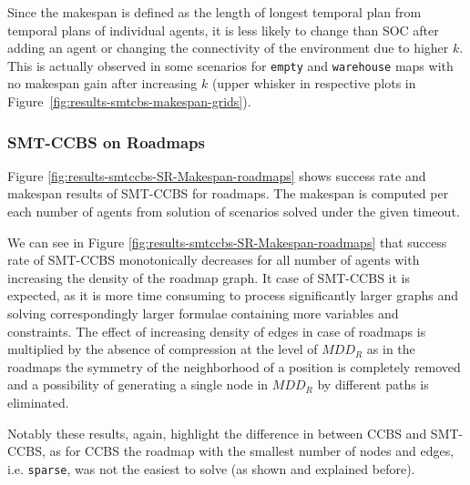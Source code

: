\documentclass[review]{elsarticle}
\newcommand{\mddr}{\ensuremath{MDD_R}\xspace}
\newcommand\roni[1]{\nb{\textbf{Roni:}}{green}{#1}}
\newcommand\pavel[1]{\nb{\textbf{Pavel:}}{blue}{#1}}
\newcommand{\ccbs}{\ac{CCBS}\xspace}
\newcommand{\smtccbs}{SMT-CCBS\xspace}
\begin{document}
Since the makespan is defined as the length of longest temporal plan from temporal plans of individual agents, it is less likely to change than SOC after adding an agent or changing the connectivity of the environment due to higher $k$. This is actually observed in some scenarios for \texttt{empty} and \texttt{warehouse} maps with no makespan gain after increasing $k$ (upper whisker in respective plots in Figure~\ref{fig:results-smtcbs-makespan-grids}).



\subsubsection{\smtccbs on Roadmaps}
Figure \ref{fig:results-smtccbs-SR-Makespan-roadmaps} shows success rate and makespan  results of \smtccbs for roadmaps. The makespan is computed per each number of agents from solution of scenarios solved under the given timeout.


We can see in Figure \ref{fig:results-smtccbs-SR-Makespan-roadmaps} that success rate of \smtccbs monotonically decreases for all number of agents with increasing the density of the roadmap graph. It case of \smtccbs it is expected, as it is more time consuming to process significantly larger graphs and solving correspondingly larger formulae containing more variables and constraints. The effect of increasing density of edges in case of roadmaps is multiplied by the absence of compression at the level of \mddr as in the roadmaps the symmetry of the neighborhood of a position is completely removed and  a possibility of generating a single node in \mddr by different paths is eliminated.

Notably these results, again, highlight the difference in between \ccbs and \smtccbs, as for \ccbs the roadmap with the smallest number of nodes and edges, i.e. \texttt{sparse}, was not the easiest to solve (as shown and explained before).
\end{document}
